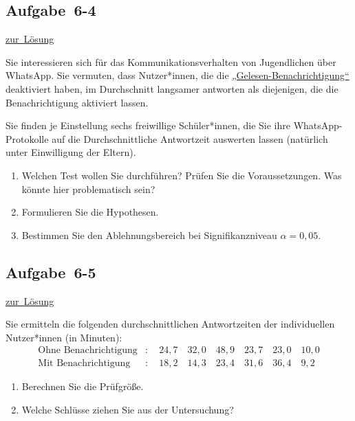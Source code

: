\documentclass[
  11pt,
  ngerman,
  a4paper,
]{report}
\providecommand{\tightlist}{%
  \setlength{\itemsep}{0pt}\setlength{\parskip}{0pt}}
\begin{document}
\hypertarget{aufgabe-6-4}{%
\subsection{Aufgabe~6-4}\label{aufgabe-6-4}}

\protect\hyperlink{loesung-6-4}{zur~Lösung}

Sie interessieren sich für das Kommunikationsverhalten von Jugendlichen über WhatsApp. Sie vermuten, dass Nutzer*innen, die die \href{https://faq.whatsapp.com/en/android/28000015/?lang=de}{„Gelesen-Benachrichtigung``} deaktiviert haben, im Durchschnitt langsamer antworten als diejenigen, die die Benachrichtigung aktiviert lassen.

Sie finden je Einstellung sechs freiwillige Schüler*innen, die Sie ihre WhatsApp-Protokolle auf die Durchschnittliche Antwortzeit auswerten lassen (natürlich unter Einwilligung der Eltern).

\begin{enumerate}
\def\labelenumi{\alph{enumi})}
\tightlist
\item
  Welchen Test wollen Sie durchführen? Prüfen Sie die Voraussetzungen. Was könnte hier problematisch sein?
\item
  Formulieren Sie die Hypothesen.
\item
  Bestimmen Sie den Ablehnungsbereich bei Signifikanzniveau \(\alpha=0{,}05\).
\end{enumerate}

\hypertarget{aufgabe-6-5}{%
\subsection{Aufgabe~6-5}\label{aufgabe-6-5}}

\protect\hyperlink{loesung-6-5}{zur~Lösung}

Sie ermitteln die folgenden durchschnittlichen Antwortzeiten der individuellen Nutzer*innen (in Minuten):
\[\begin{aligned}
\textrm{Ohne Benachrichtigung} &: \quad 24{,}7\quad32{,}0\quad48{,}9\quad23{,}7\quad23{,}0\quad10{,}0\\
\textrm{Mit Benachrichtigung} &: \quad18{,}2\quad14{,}3\quad23{,}4\quad31{,}6\quad36{,}4\quad 9{,}2
\end{aligned}\]

\begin{enumerate}
\def\labelenumi{\alph{enumi})}
\tightlist
\item
  Berechnen Sie die Prüfgröße.
\item
  Welche Schlüsse ziehen Sie aus der Untersuchung?
\end{enumerate}
\end{document}
